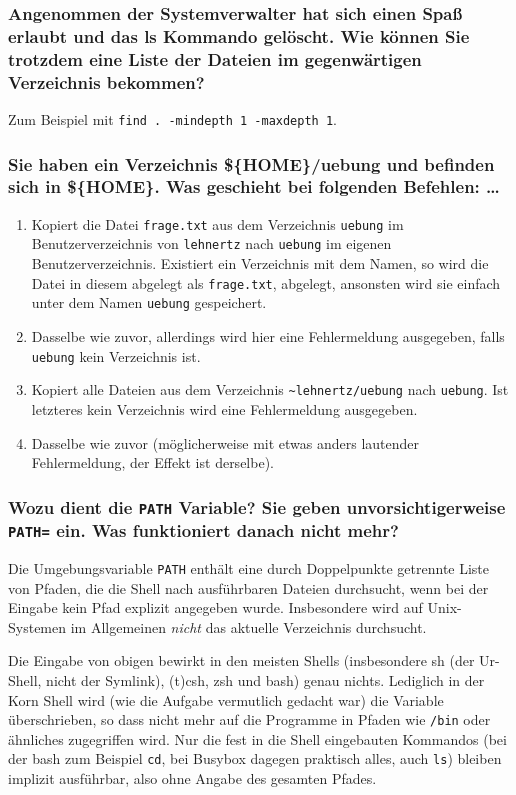 \subsubsection*{Angenommen der Systemverwalter hat sich einen Spaß erlaubt und
das ls Kommando gelöscht. Wie können Sie trotzdem eine Liste der Dateien im
gegenwärtigen Verzeichnis bekommen?}
Zum Beispiel mit \lstinline'find . -mindepth 1 -maxdepth 1'.

\subsubsection*{Sie haben ein Verzeichnis \$\{HOME\}/uebung und befinden sich in
\$\{HOME\}.  Was geschieht bei folgenden Befehlen: \dots}
\begin{enumerate}
    \item Kopiert die Datei \verb'frage.txt' aus dem Verzeichnis \verb'uebung'
      im Benutzerverzeichnis von \verb'lehnertz' nach \verb'uebung' im eigenen
      Benutzerverzeichnis. Existiert ein Verzeichnis mit dem Namen, so wird die
      Datei in diesem abgelegt als \verb'frage.txt', abgelegt, ansonsten wird
      sie einfach unter dem Namen \verb'uebung' gespeichert.
    \item Dasselbe wie zuvor, allerdings wird hier eine Fehlermeldung
      ausgegeben, falls \verb'uebung' kein Verzeichnis ist.
    \item Kopiert alle Dateien aus dem Verzeichnis \verb'~lehnertz/uebung' nach
      \verb'uebung'. Ist letzteres kein Verzeichnis wird eine Fehlermeldung
      ausgegeben.
    \item Dasselbe wie zuvor (möglicherweise mit etwas anders lautender
      Fehlermeldung, der Effekt ist derselbe).
\end{enumerate}

\subsubsection*{Wozu dient die \lstinline'PATH' Variable? Sie geben
unvorsichtigerweise \lstinline'PATH=' ein. Was funktioniert danach nicht mehr?}
Die Umgebungsvariable \lstinline'PATH' enthält eine durch Doppelpunkte getrennte
Liste von Pfaden, die die Shell nach ausführbaren Dateien durchsucht, wenn bei
der Eingabe kein Pfad explizit angegeben wurde. Insbesondere wird auf
Unix-Systemen im Allgemeinen \emph{nicht} das aktuelle Verzeichnis durchsucht.

Die Eingabe von obigen bewirkt in den meisten Shells (insbesondere sh (der
Ur-Shell, nicht der Symlink), (t)csh, zsh und bash) genau nichts. Lediglich in
der Korn Shell wird (wie die Aufgabe vermutlich gedacht war) die Variable
überschrieben, so dass nicht mehr auf die Programme in Pfaden wie \verb'/bin'
oder ähnliches zugegriffen wird. Nur die fest in die Shell eingebauten Kommandos
(bei der bash zum Beispiel \verb'cd', bei Busybox dagegen praktisch alles, auch
\verb'ls') bleiben implizit ausführbar, also ohne Angabe des gesamten Pfades.

